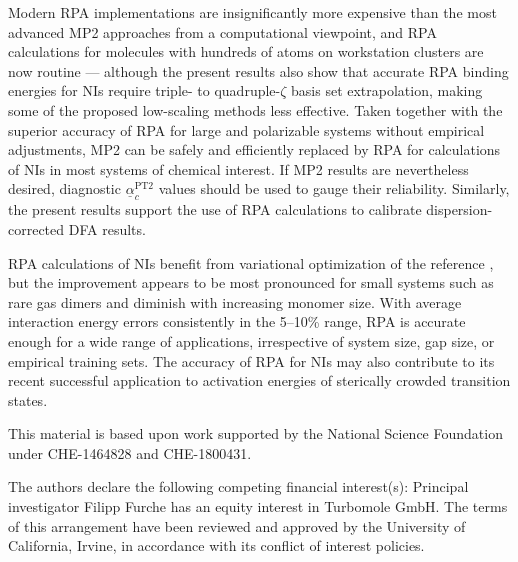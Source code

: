 \documentclass[journal=jctcce,manuscript=article]{achemso}
\begin{document}
Modern RPA implementations are insignificantly more expensive than the
most advanced MP2 approaches from a computational viewpoint, and RPA
calculations for molecules with 
hundreds of atoms on workstation clusters are now routine
\cite{Eshuis10JChemPhys132p234114,Hesselmann12PhysRevA85p012517,Riplinger13JChemPhys,   
  Kallay15JChemPhys142p204105,Chen17AnnuRevPhysChem68p421,Schurkus16JChemPhys144p031101,
  doi:10.1021/acs.jctc.6b01235,doi:10.1063/1.5052572,doi:10.1021/acs.jctc.9b00444}
--- although the present results also show that accurate RPA binding
energies for NIs require triple- to quadruple-$\zeta$ basis set
extrapolation, making some of the proposed low-scaling methods less 
effective. 
Taken together with the superior accuracy of RPA for large and polarizable
systems without empirical adjustments, MP2 can be safely and efficiently
replaced by RPA for calculations of NIs in most systems of chemical
interest. If MP2 results are nevertheless desired,
diagnostic $\underline{\alpha}_{c}^{\text{PT2}}$ values should be
used to gauge their reliability. Similarly, the present results support
the use of RPA calculations to calibrate dispersion-corrected DFA results.

RPA calculations of NIs benefit from variational
optimization of the reference \cite{PhysRevA.99.012518}, but the
improvement appears to be most pronounced for small systems such as rare
gas dimers and diminish with increasing monomer size. With average interaction
energy errors consistently in the 5--10\% range, RPA is accurate enough for
a wide range of applications, irrespective of system size, gap size, or empirical
training sets. The accuracy of RPA for NIs may also contribute to its
recent successful application to activation energies of sterically
crowded transition
states.\cite{Tao16ChemEurJ22p8786,doi:10.1021/acs.joc.9b01319} 

\begin{acknowledgement}
  
This material is based upon work supported by
the National Science Foundation under CHE-1464828 and CHE-1800431.

The authors declare the following competing financial interest(s):
Principal investigator Filipp Furche has an equity interest in Turbomole
GmbH. The terms of this arrangement have been reviewed and approved by
the University of California, Irvine, in accordance with its conflict of
interest policies.

\end{acknowledgement}
\end{document}
